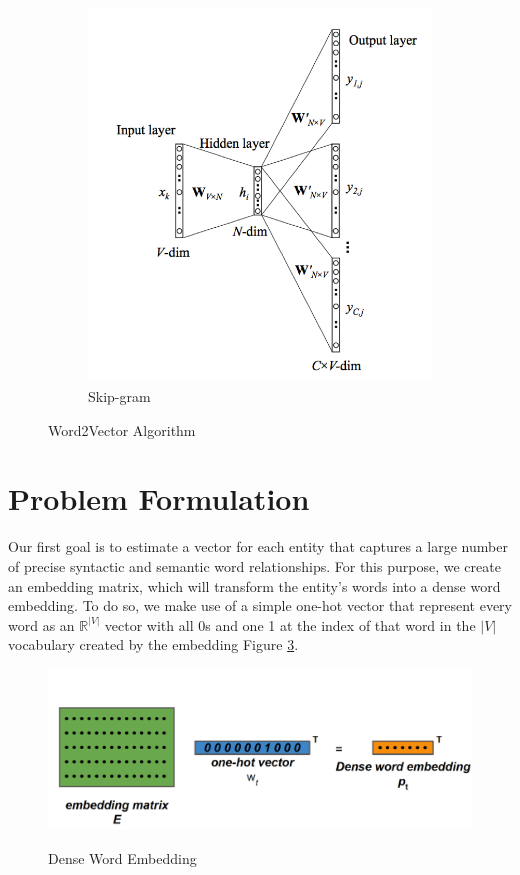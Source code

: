 \documentclass[]{article}
\begin{document}
\begin{figure}
\begin{subfigure}{.5\textwidth}
			\includegraphics[width=.95\linewidth]{Figures/Skip}
			\caption{Skip-gram}
			\label{fig:sfig2}
		\end{subfigure}
		\caption{Word2Vector Algorithm}
		\label{fig:Word2}
	\end{figure}
	
	\section{Problem Formulation}
	Our first goal is to estimate a vector for each entity that captures a large number of precise syntactic and semantic word relationships. For this purpose, we create an embedding matrix, which will transform the entity's words into a dense word embedding.  To do so, we make use of a simple one-hot vector that represent every word as an $\mathbb{R}^{|V|}$ vector with all 0s and one 1 at the index of that word in the $|V|$ vocabulary created by the embedding Figure \ref{fig:DE}.
	
	\begin{figure}[h]
		\caption{Dense Word Embedding}
		\centering
		\includegraphics[width=1\textwidth]{Figures/Embeddings}
		\label{fig:DE}
	\end{figure}
	
\end{document}
